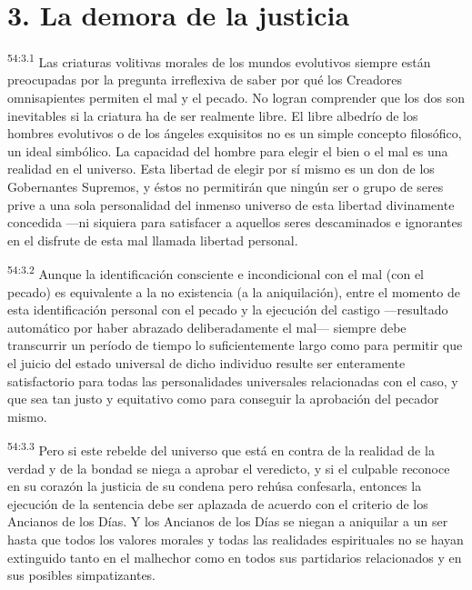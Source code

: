 \section*{3. La demora de la justicia}
\par
\textsuperscript{54:3.1} Las criaturas volitivas morales de los mundos evolutivos siempre están preocupadas por la pregunta irreflexiva de saber por qué los Creadores omnisapientes permiten el mal y el pecado. No logran comprender que los dos son inevitables si la criatura ha de ser realmente libre. El libre albedrío de los hombres evolutivos o de los ángeles exquisitos no es un simple concepto filosófico, un ideal simbólico. La capacidad del hombre para elegir el bien o el mal es una realidad en el universo. Esta libertad de elegir por sí mismo es un don de los Gobernantes Supremos, y éstos no permitirán que ningún ser o grupo de seres prive a una sola personalidad del inmenso universo de esta libertad divinamente concedida ---ni siquiera para satisfacer a aquellos seres descaminados e ignorantes en el disfrute de esta mal llamada libertad personal.

\par
\textsuperscript{54:3.2} Aunque la identificación consciente e incondicional con el mal (con el pecado) es equivalente a la no existencia (a la aniquilación), entre el momento de esta identificación personal con el pecado y la ejecución del castigo ---resultado automático por haber abrazado deliberadamente el mal--- siempre debe transcurrir un período de tiempo lo suficientemente largo como para permitir que el juicio del estado universal de dicho individuo resulte ser enteramente satisfactorio para todas las personalidades universales relacionadas con el caso, y que sea tan justo y equitativo como para conseguir la aprobación del pecador mismo.

\par
\textsuperscript{54:3.3} Pero si este rebelde del universo que está en contra de la realidad de la verdad y de la bondad se niega a aprobar el veredicto, y si el culpable reconoce en su corazón la justicia de su condena pero rehúsa confesarla, entonces la ejecución de la sentencia debe ser aplazada de acuerdo con el criterio de los Ancianos de los Días. Y los Ancianos de los Días se niegan a aniquilar a un ser hasta que todos los valores morales y todas las realidades espirituales no se hayan extinguido tanto en el malhechor como en todos sus partidarios relacionados y en sus posibles simpatizantes.


